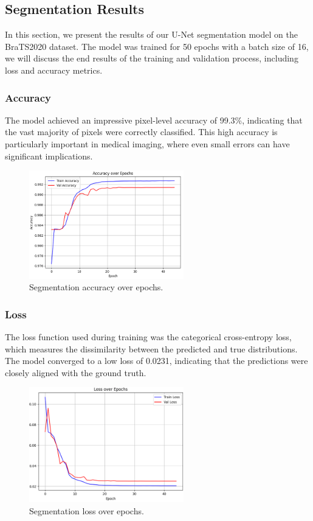 \subsection{Segmentation Results}
\label{sec:segmentation-results}
In this section, we present the results of our U-Net segmentation model on the BraTS2020 dataset. The model was trained for 50 epochs with a batch size of 16, we will discuss the end results of the training and validation process, including loss and accuracy metrics.

\subsubsection{Accuracy}
The model achieved an impressive pixel-level accuracy of 99.3\%, indicating that the vast majority of pixels were correctly classified. This high accuracy is particularly important in medical imaging, where even small errors can have significant implications.
\begin{figure}[ht]
  \centering
  \includegraphics[width=0.6\textwidth]{Images/Chapter3/unet_acc.png}
  \caption{Segmentation accuracy over epochs.}
  \label{fig:unet-acc}
\end{figure}

\subsubsection{Loss}
The loss function used during training was the categorical cross-entropy loss, which measures the dissimilarity between the predicted and true distributions. The model converged to a low loss of 0.0231, indicating that the predictions were closely aligned with the ground truth.

\begin{figure}[h]
  \centering
  \includegraphics[width=0.6\textwidth]{Images/Chapter3/unet_loss.png}
  \caption{Segmentation loss over epochs.}
  \label{fig:unet-loss}
\end{figure}

